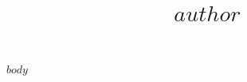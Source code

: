 \documentclass[12pt,letter,sans]{moderncv}
\title{$author$}
\begin{document}
\makecvtitle

$body$
\end{document}
